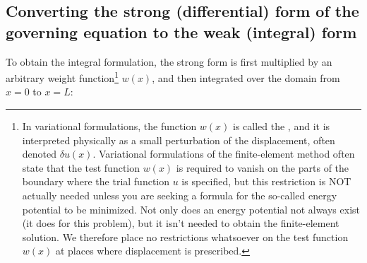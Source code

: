 \subsection{Converting the strong (differential) form of the governing equation to the weak (integral) form}
{}
To obtain the integral formulation, the strong form is first multiplied by an arbitrary weight function\footnote{In variational formulations, the function $w(x)$ is called the , and it is interpreted physically as a small perturbation of the displacement, often denoted $\delta u(x)$.  Variational formulations of the finite-element method often state that the test function $w(x)$ is required to vanish on the parts of the boundary where the trial function $u$ is specified, but this restriction is NOT actually needed unless you are seeking a formula for the so-called energy potential to be minimized.  Not only does an energy potential not always exist (it does for this problem), but it isn't needed to obtain the finite-element solution. We therefore place no restrictions whatsoever on the test function $w(x)$ at places where displacement is prescribed.} $w(x)$, and then integrated over the domain from $x=0$ to $x=L$:


